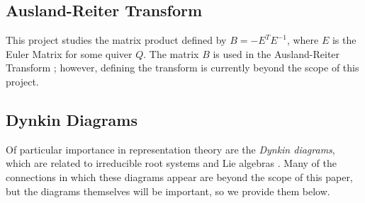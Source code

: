 \documentclass{amsart}
\theoremstyle{theorem}
\theoremstyle{theorem*}
\theoremstyle{definition}
\begin{document}
\subsection{Ausland-Reiter Transform}

This project studies the matrix product defined by $B = -E^T E^{-1}$, where $E$
is the Euler Matrix for some quiver $Q$. The matrix $B$ is used in the
Ausland-Reiter Transform \cite{dw}; however, defining the transform is currently
beyond the scope of this project.
\subsection{Dynkin Diagrams}

Of particular importance in representation theory are the \textit{Dynkin
    diagrams}, which are related to irreducible root systems and Lie algebras
\cite{dw}. Many of the connections in which these diagrams appear are beyond
the scope of this paper, but the diagrams themselves will be important, so
we provide them below.
\end{document}
